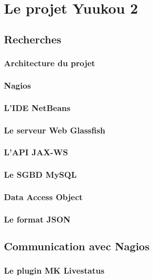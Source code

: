 \chapter{Le projet Yuukou 2}

\section{Recherches}

\subsection{Architecture du projet}

\subsection{Nagios}

\subsection{L'IDE NetBeans}

\subsection{Le serveur Web Glassfish}

\subsection{L'API JAX-WS}

\subsection{Le SGBD MySQL}

\subsection{Data Access Object}

\subsection{Le format JSON}

\section{Communication avec Nagios}

\subsection{Le plugin MK Livestatus}

